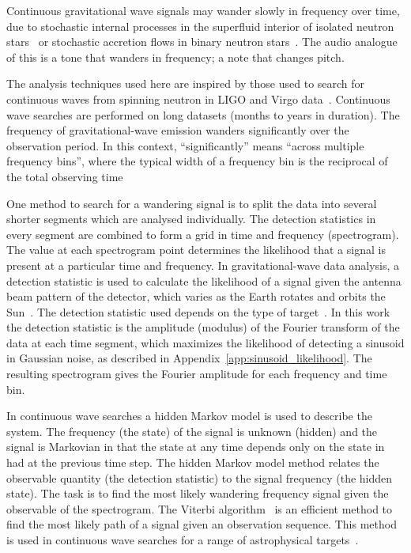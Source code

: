 \documentclass[paper-main.tex]{subfiles}
\begin{document}
Continuous gravitational wave signals may wander slowly in frequency over time, due to stochastic internal processes in the superfluid interior of isolated neutron stars~\cite{MelatosDouglassSimula:2015,Jones:2010} or stochastic accretion flows in binary neutron stars~\cite{BildstenTB:1998}. 
The audio analogue of this is a tone that wanders in frequency; a note that changes pitch. 


The analysis techniques used here are inspired by those used to search for continuous waves from spinning neutron in LIGO and Virgo data~\cite{SuvorovaEtAl:2016,SuvorovaEtAl:2017}.
Continuous wave searches are performed on long datasets (months to years in duration). 
The frequency of gravitational-wave emission wanders significantly over the observation period. 
In this context, ``significantly'' means ``across multiple frequency bins'', where the typical width of a frequency bin is the reciprocal of the total observing time~\cite{JKS:1998,ScoX1O2Viterbi:2019}



One method to search for a wandering signal is to split the data into several shorter segments which are analysed individually. 
The detection statistics in every segment are combined to form a grid in time and frequency (spectrogram). 
The value at each spectrogram point determines the likelihood that a signal is present at a particular time and frequency. 
In gravitational-wave data analysis, a detection statistic is used to calculate the likelihood of a signal given the antenna beam pattern of the detector, which varies as the Earth rotates and orbits the Sun~\cite{JKS:1998}.
The detection statistic used depends on the type of target~\cite{JKS:1998,SuvorovaEtAl:2017}. 
In this work the detection statistic is the amplitude (modulus) of the Fourier transform of the data at each time segment, which maximizes the likelihood of detecting a sinusoid in Gaussian noise, as described in Appendix~\ref{app:sinusoid_likelihood}. 
The resulting spectrogram gives the Fourier amplitude for each frequency and time bin. 


In continuous wave searches a hidden Markov model is used to describe the system. 
The frequency (the state) of the signal is unknown (hidden) and the signal is Markovian in that the state at any time depends only on the state in had at the previous time step. 
The hidden Markov model method relates the observable quantity (the detection statistic) to the signal frequency (the hidden state). 
The task is to find the most likely wandering frequency signal given the observable of the spectrogram. 
The Viterbi algorithm~\cite{Viterbi:1967} is an efficient method to find the most likely path of a signal given an observation sequence. 
This method is used in continuous wave searches for a range of astrophysical targets~\cite{ScoX1O2Viterbi:2019,ScoX1ViterbiO1:2017,MillhouseStrangMelatos:2020,JonesSun:2020,MiddletonEtAlO2LMXBs:2020,PostMergerRemnantSearch:2019,SunEtAlSNR:2018,viterbi_application}. 
 
\end{document}
